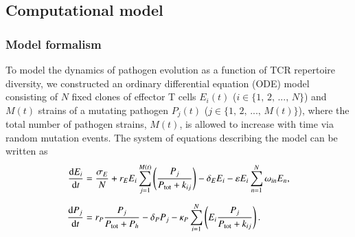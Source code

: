 \subsection{Computational model}

\subsubsection*{Model formalism}
To model the dynamics of pathogen evolution as a function of TCR repertoire diversity, we constructed an ordinary differential equation (ODE) model consisting of $N$ fixed clones of effector T cells $E_i(t)$ ($i \in \{1,\,2,\,...,\,N\}$) and $M(t)$ strains of a mutating pathogen $P_j(t)$ ($j \in \{1,\,2,\,...,\,M(t)\}$), where the total number of pathogen strains, $M(t)$, is allowed to increase with time via random mutation events. The system of equations describing the model can be written as
%
\begin{align}
    \dv{E_i}{t} &= \frac{\sigma_E}{N} + r_E E_i \sum_{j=1}^{M(t)}\left(\frac{P_j}{P_\textup{tot} + k_{ij}} \right) -\delta_E E_i - \varepsilon E_i \sum_{n=1}^N \omega_{in} E_n, \label{eq:VE_E} \\[0.5em]
    \dv{P_j}{t} &= r_P \frac{P_j}{P_{\textup{tot}}+P_h} - \delta_P P_j - \kappa_P \sum_{i=1}^{N}\left(E_i \frac{P_j}{P_{\textup{tot}} + k_{ij}} \right). \label{eq:VE_P}
\end{align}


